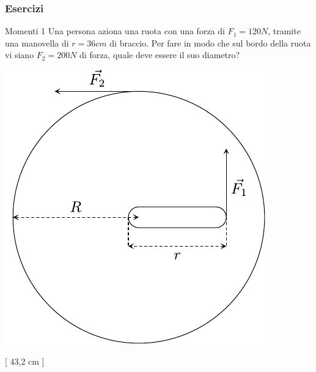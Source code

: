 \subsubsection{Esercizi}
\begin{esercizio}{Momenti 1}
	Una persona aziona una ruota con una forza di $ F_1 = 120 N $, tramite una manovella di $ r = 36 cm $ di braccio.
	\vskip3mm
	Per fare in modo che sul bordo della ruota vi siano $ F_2 = 200 N $ di forza, quale deve essere il suo diametro?

	\begin{center}
		\includegraphics{Images/Momenti1.pdf }
	\end{center}

	\hfill [ 43,2 cm ]
\end{esercizio}

